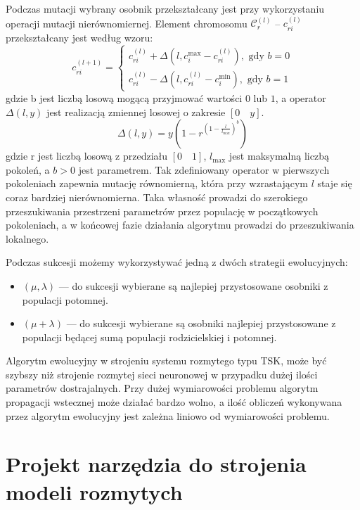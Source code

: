 \documentclass[a4paper,12pt,titlepage]{article}
\newcommand{\C}{\ensuremath{\mathcal{C}}}
\begin{document}
Podczas mutacji wybrany osobnik przekształcany jest przy wykorzystaniu operacji mutacji nierównomiernej. Element chromosomu $\C _r^{(l)}$ -- $c _{ri}^{(l)}$ przekształcany jest według wzoru:
\begin{equation}
c_{ri}^{(l+1)} = \left\{
\begin{array}{l}
c_{ri}^{(l)} + \Delta (l, c_i^{\mathrm{max}} - c_{ri}^{(l)}),\mbox{ gdy }b = 0 \\
c_{ri}^{(l)} - \Delta (l, c_{ri}^{(l)} - c_i^{\mathrm{min}}) ,\mbox{ gdy }b = 1
\end{array}
\right.
\end{equation}
gdzie b jest liczbą losową mogącą przyjmować wartości $0$ lub $1$, a operator $\Delta(l, y)$ jest realizacją zmiennej losowej o zakresie $[0 \quad y]$.
\begin{equation}
\Delta(l, y) = y(1 - r^{(1 - \frac{l}{l_{\mathrm{max}}})^b})
\end{equation}
gdzie r jest liczbą losową z przedziału $[0 \quad 1]$, $l_{\mathrm{max}}$ jest maksymalną liczbą pokoleń, a $b > 0$ jest parametrem. Tak zdefiniowany operator w pierwszych pokoleniach zapewnia mutację równomierną, która przy wzrastającym $l$ staje się coraz bardziej nierównomierna. Taka własność prowadzi do szerokiego przeszukiwania przestrzeni parametrów przez populację w początkowych pokoleniach, a w końcowej fazie działania algorytmu prowadzi do przeszukiwania lokalnego.

Podczas sukcesji możemy wykorzystywać jedną z dwóch strategii ewolucyjnych:
\begin{itemize}
\item $(\mu, \lambda)$ --- do sukcesji wybierane są najlepiej przystosowane osobniki z populacji potomnej.
\item $(\mu + \lambda)$ --- do sukcesji wybierane są osobniki najlepiej przystosowane z populacji będącej sumą populacji rodzicielskiej i potomnej.
\end{itemize}

Algorytm ewolucyjny w strojeniu systemu rozmytego typu TSK, może być szybszy niż strojenie rozmytej sieci neuronowej w przypadku dużej ilości parametrów dostrajalnych. Przy dużej wymiarowości problemu algorytm propagacji wstecznej może działać bardzo wolno, a ilość obliczeń wykonywana przez algorytm ewolucyjny jest zależna liniowo od wymiarowości problemu.

\section{Projekt narzędzia do strojenia modeli rozmytych}
\end{document}

